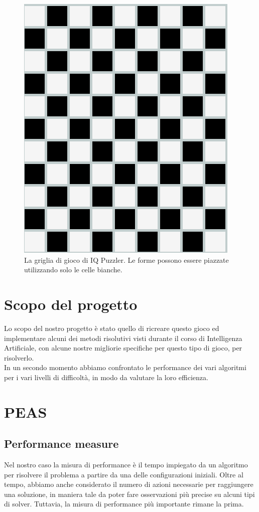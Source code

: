 \begin{figure}[h]
	\centering
	\includegraphics[scale=0.3]{immagini/griglia}
	\caption{La griglia di gioco di IQ Puzzler. Le forme possono essere piazzate utilizzando solo le celle bianche.}
	\label{fig:griglia}
\end{figure}

\section{Scopo del progetto}
Lo scopo del nostro progetto è stato quello di ricreare questo gioco ed implementare alcuni dei metodi risolutivi visti durante il corso di Intelligenza Artificiale, con alcune nostre migliorie specifiche per questo tipo di gioco, per risolverlo. \\
In un secondo momento abbiamo confrontato le performance dei vari algoritmi per i vari livelli di difficoltà, in modo da valutare la loro efficienza.

\section{PEAS}

\subsection{Performance measure}
\label{performance}
Nel nostro caso la misura di performance è il tempo impiegato da un algoritmo per risolvere il problema a partire da una delle configurazioni iniziali. Oltre al tempo, abbiamo anche considerato il numero di azioni necessarie per raggiungere una soluzione, in maniera tale da poter fare osservazioni più precise su alcuni tipi di solver. Tuttavia, la misura di performance più importante rimane la prima.

